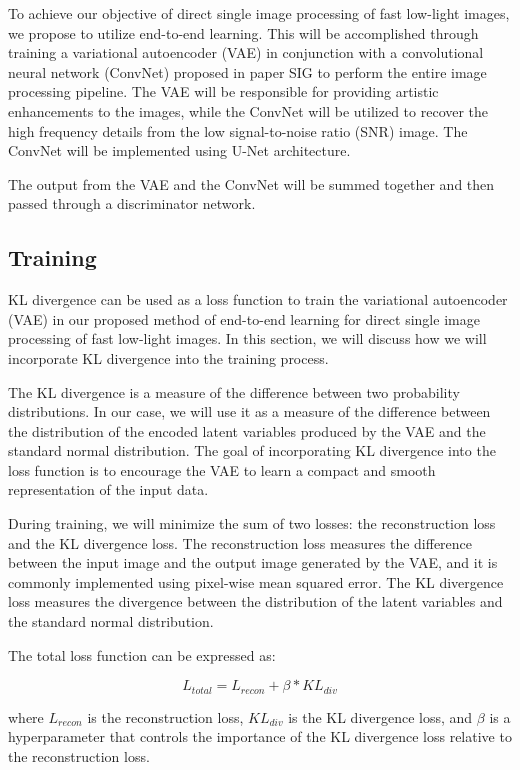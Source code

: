 \documentclass{article}
\begin{document}
To achieve our objective of direct single image processing of fast low-light images, we propose to utilize end-to-end learning. This will be accomplished through training a variational autoencoder (VAE) in conjunction with a convolutional neural network (ConvNet) proposed in paper SIG \cite{LearningToSeeInTheDark} to perform the entire image processing pipeline. The VAE will be responsible for providing artistic enhancements to the images, while the ConvNet will be utilized to recover the high frequency details from the low signal-to-noise ratio (SNR) image. The ConvNet will be implemented using U-Net architecture. %

The output from the VAE and the ConvNet will be summed together and then passed through a discriminator network. 

\subsection{Training}
KL divergence can be used as a loss function to train the variational autoencoder (VAE) in our proposed method of end-to-end learning for direct single image processing of fast low-light images. In this section, we will discuss how we will incorporate KL divergence into the training process.

The KL divergence is a measure of the difference between two probability distributions. In our case, we will use it as a measure of the difference between the distribution of the encoded latent variables produced by the VAE and the standard normal distribution. The goal of incorporating KL divergence into the loss function is to encourage the VAE to learn a compact and smooth representation of the input data.

During training, we will minimize the sum of two losses: the reconstruction loss and the KL divergence loss. The reconstruction loss measures the difference between the input image and the output image generated by the VAE, and it is commonly implemented using pixel-wise mean squared error. The KL divergence loss measures the divergence between the distribution of the latent variables and the standard normal distribution.

The total loss function can be expressed as:

\begin{equation}
    L_{total} = L_{recon} + \beta * KL_{div}
\end{equation}

where $L_{recon}$ is the reconstruction loss, $KL_{div}$ is the KL divergence loss, and $\beta$ is a hyperparameter that controls the importance of the KL divergence loss relative to the reconstruction loss.
\end{document}
